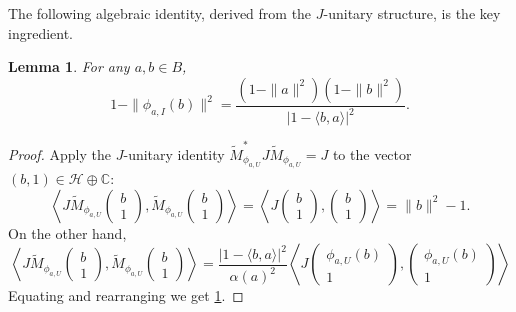 \documentclass[12pt]{amsart}
\newtheorem{lemma}[theorem]{Lemma}
\theoremstyle{definition}
\begin{document}
The following algebraic identity, derived from the $J$-unitary structure, is the key ingredient.
\begin{lemma}\label{lem:sym}
For any $a,b\in B$,
\begin{equation}\label{eq:sym}
1-\|\phi_{a,I}(b)\|^2 = \frac{(1-\|a\|^2)(1-\|b\|^2)}{|1-\langle b,a\rangle|^2}.
\end{equation}
\end{lemma}
 
\begin{proof}
Apply the $J$-unitary identity $\widetilde{M}_{\phi_{a,U}}^*J\widetilde{M}_{\phi_{a,U}} = J$ to the vector $(b,1)\in\mathcal{H}\oplus\mathbb{C}$:
\[
\left\langle J\widetilde{M}_{\phi_{a,U}}\begin{pmatrix}
    b\\
    1
\end{pmatrix}, \widetilde{M}_{\phi_{a,U}}\begin{pmatrix}
    b\\
    1
\end{pmatrix}\right\rangle = \left\langle J\begin{pmatrix}
    b\\
    1
\end{pmatrix},\begin{pmatrix}
    b\\
    1
\end{pmatrix}\right\rangle = \|b\|^2-1.
\]
On the other hand,
\[
\left\langle J\widetilde{M}_{\phi_{a,U}}\begin{pmatrix}
    b\\
    1
\end{pmatrix}, \widetilde{M}_{\phi_{a,U}}\begin{pmatrix}
    b\\
    1
\end{pmatrix}\right\rangle =\frac{|1-\langle b, a \rangle|^2}{\alpha(a)^2}\left\langle J\begin{pmatrix}
   \phi_{a,U}(b)\\
    1
\end{pmatrix}, \begin{pmatrix}
   \phi_{a,U}(b)\\
    1
\end{pmatrix}\right\rangle 
\]
Equating and rearranging we get \ref{lem:sym}.
\end{proof}
 
\end{document}
